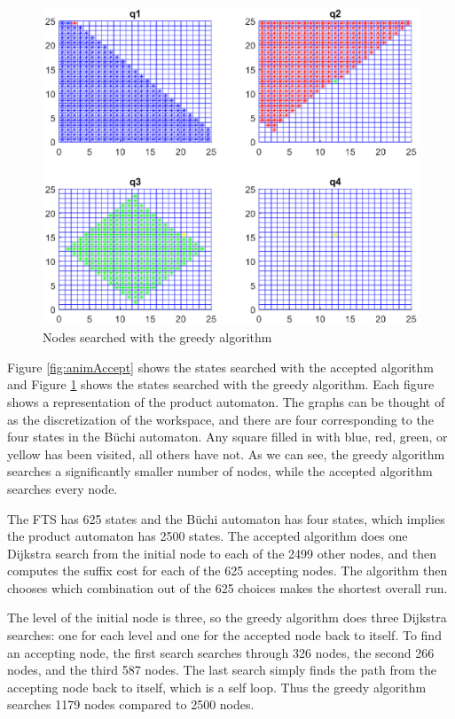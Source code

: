 \begin{figure}[!htb]
\centering
\includegraphics[scale=0.7]{ourPlot}
\caption{Nodes searched with the greedy algorithm}
\label{fig:animOur}
\end{figure}

Figure \ref{fig:animAccept} shows the states searched with the accepted algorithm and Figure \ref{fig:animOur} shows the states searched with the greedy algorithm. Each figure shows a representation of the product automaton. The graphs can be thought of as the discretization of the workspace, and there are four corresponding to the four states in the B\"uchi automaton. Any square filled in with blue, red, green, or yellow has been visited, all others have not. As we can see, the greedy algorithm searches a significantly smaller number of nodes, while the accepted algorithm searches every node.

The FTS has 625 states and the B\"uchi automaton has four states, which implies the product automaton has 2500 states. The accepted algorithm does one Dijkstra search from the initial node to each of the 2499 other nodes, and then computes the suffix cost for each of the 625 accepting nodes. The algorithm then chooses which combination out of the 625 choices makes the shortest overall run. 

The level of the initial node is three, so the greedy algorithm does three Dijkstra searches: one for each level and one for the accepted node back to itself. To find an accepting node, the first search searches through 326 nodes, the second 266 nodes, and the third 587 nodes. The last search simply finds the path from the accepting node back to itself, which is a self loop. Thus the greedy algorithm searches 1179 nodes compared to 2500 nodes.  


